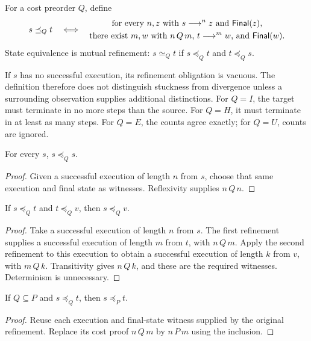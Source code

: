 \begin{definition}\label{term:refinement}
For a cost preorder $Q$, define
\[
 s\preceq_Q t\quad\Longleftrightarrow\quad
 \begin{gathered}
 \text{for every $n,z$ with $s\mathrel{\longrightarrow^{n}}z$ and $\mathsf{Final}(z)$,}\\
 \text{there exist $m,w$ with $n\,Q\,m$, $t\mathrel{\longrightarrow^{m}}w$, and $\mathsf{Final}(w)$.}
 \end{gathered}
\]
State equivalence is mutual refinement:
$s\simeq_Q t$ if $s\preceq_Q t$ and $t\preceq_Q s$.
\end{definition}
If $s$ has no successful execution, its refinement obligation is vacuous.
The definition therefore does not distinguish stuckness from divergence
unless a surrounding observation supplies additional distinctions.
For $Q=I$, the target must terminate in no more steps than the source.
For $Q=H$, it must terminate in at least as many steps. For $Q=E$, the
counts agree exactly; for $Q=U$, counts are ignored.

\begin{lemma}[Reflexivity]
For every $s$, $s\preceq_Q s$.
\end{lemma}
\begin{proof}
Given a successful execution of length $n$ from $s$, choose that same
execution and final state as witnesses. Reflexivity supplies $n\,Q\,n$.
\end{proof}

\begin{lemma}[Transitivity]
If $s\preceq_Q t$ and $t\preceq_Q v$, then $s\preceq_Q v$.
\end{lemma}
\begin{proof}
Take a successful execution of length $n$ from $s$. The first refinement
supplies a successful execution of length $m$ from $t$, with $n\,Q\,m$.
Apply the second refinement to this execution to obtain a successful
execution of length $k$ from $v$, with $m\,Q\,k$. Transitivity gives
$n\,Q\,k$, and these are the required witnesses. Determinism is unnecessary.
\end{proof}

\begin{lemma}
If $Q\subseteq P$ and $s\preceq_Q t$, then $s\preceq_P t$.
\end{lemma}
\begin{proof}
Reuse each execution and final-state witness supplied by the original
refinement. Replace its cost proof $n\,Q\,m$ by $n\,P\,m$ using the inclusion.
\end{proof}
